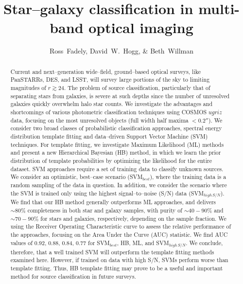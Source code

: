 \documentclass[12pt,preprint]{aastex}
\begin{document}
\title{Star--galaxy classification in multi-band optical imaging}
\author{Ross~Fadely,
        David~W.~Hogg,
        \& Beth~Willman}



%
%
\begin{abstract}

Current and next--generation wide--field, ground--based optical surveys, like PanSTARRs, DES, and LSST, will survey large 
portions of the sky to limiting magnitudes of $r \gtrsim 24$.  The problem of source classification, particularly that of separating 
stars from galaxies, is severe at such depths since the number of unresolved galaxies quickly overwhelm halo star counts.  
We investigate the advantages and shortcomings of various photometric classification techniques using COSMOS 
$ugriz$ data, focusing on the most unresolved objects (full width half maxima $<0.2''$).  We consider two broad classes of 
probabilistic classification approaches, spectral energy distribution template fitting and data--driven Support Vector Machine 
 (SVM) techniques.  For template fitting, we investigate Maximum Likelihood (ML) methods and present a new Hierarchical Bayesian 
(HB) method, in which we learn the prior distribution of template probabilities by optimizing the likelihood for the entire dataset.  
SVM approaches require a set of training data to classify unknown sources.  We consider an optimistic, best--case scenario 
(SVM$_{best}$), where the training data is a random sampling of the data in question.  In addition, we consider the scenario 
where the SVM is trained only using the highest signal--to--noise (S/N) data (SVM$_{high\,S/N}$).  We find that our HB method 
generally outperforms ML approaches, and delivers $\sim80\%$ completeness in both star and galaxy samples, with purity 
of $\sim40-90\%$ and $\sim70-90\%$ for stars and galaxies, respectively, depending on the sample fraction.  We using the 
Receiver Operating Characteristic curve to assess the relative performance of the approaches, focusing on the Area Under 
the Curve (AUC) statistic.  We find AUC values of 0.92, 0.88, 0.84, 0.77 for SVM$_{best}$, HB, ML, and SVM$_{high\,S/N}$.  
We conclude, therefore, that a well trained SVM will outperform the template fitting methods examined here.  However, if 
trained on data with high S/N, SVMs perform worse than template fitting.  Thus, HB template fitting may prove to be a useful and 
important method for source classification in future surveys.

\end{abstract}
\end{document}
